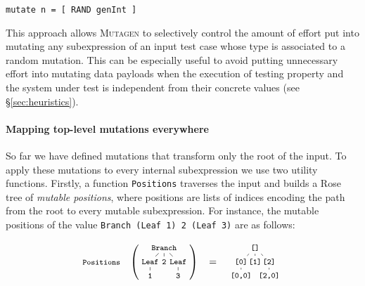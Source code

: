 \documentclass[sigconf,review,anonymous]{acmart}
\newcommand{\mutagen}{\textsc{Mutagen}\xspace}
\begin{document}
\begin{verbatim}
mutate n = [ RAND genInt ]
\end{verbatim}

\noindent This approach allows \mutagen to selectively control the amount of
effort put into mutating any subexpression of an input test case whose type is
associated to a random mutation.
%
This can be especially useful to avoid putting unnecessary effort into mutating
data payloads when the execution of testing property and the system under test
is independent from their concrete values (see \S \ref{sec:heuristics}). 


\paragraph{Mapping top-level mutations everywhere}

So far we have defined mutations that transform only the root of the input.
%
To apply these mutations to every internal subexpression we use two utility
functions.
%
Firstly, a function \texttt{Positions} traverses the input and builds a Rose
tree\cite{meertens1988first} of \emph{mutable positions}, where positions are
lists of indices encoding the path from the root to every mutable subexpression.
%
%
%
%
For instance, the mutable positions of the value \texttt{Branch (Leaf 1) 2
  (Leaf 3)} are as follows:

\vspace{-5pt}
\begin{equation}
  \nonumber
  \footnotesize
  \texttt{Positions}\quad
  \left(
  \tikz[
    baseline=-6mm,
    level distance=0.5cm,
    level 1/.style={sibling distance=0.5cm},
    level 2/.style={sibling distance=0.5cm}
  ]{
    \node {\texttt{Branch}}
      child {node {\texttt{Leaf}}
        child {node {\texttt{1}}}
      }
      child {node {\texttt{2}}}
      child {node {\texttt{Leaf}}
        child {node {\texttt{3}}}
      };
  }
  \right)
  \quad
  =
  \quad
  \tikz[
    baseline=-6mm,
    level distance=0.5cm,
    level 1/.style={sibling distance=0.5cm},
    level 2/.style={sibling distance=0.5cm}
  ]{
    \node {\texttt{[]}}
      child {node {\texttt{[0]}}
        child {node {\texttt{[0,0]}}}
      }
      child {node {\texttt{[1]}}}
      child {node {\texttt{[2]}}
        child {node {\texttt{[2,0]}}}
      };
  }
\end{equation}
\vspace{-5pt}
\end{document}
